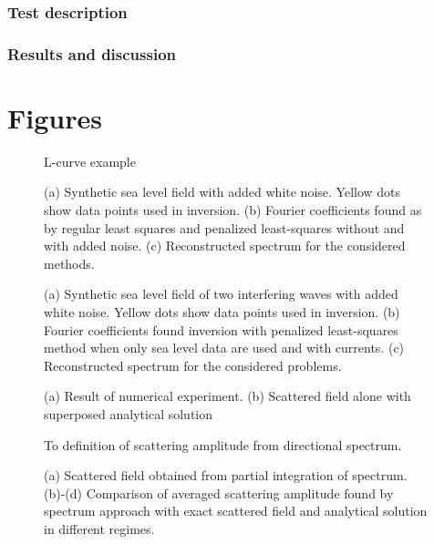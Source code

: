 \subsubsection{Test description}
\subsubsection{Results and discussion}

\newpage
\section{Figures}
\begin{figure}
	\centering
	\caption{L-curve example}
	\label{C1:F1.lcurve}
\end{figure}

\begin{figure}
	\caption{(a) Synthetic sea level field with added white noise. Yellow dots show data points 
	used in inversion. (b) Fourier coefficients found as by regular least squares and penalized 
	least-squares without and with added noise. (c) Reconstructed spectrum for the considered 
	methods.}
	\label{C1:F2.1w}
\end{figure}

\begin{figure}
	\label{C1:F2.2w}
	\centering
	\caption{(a) Synthetic sea level field of two interfering waves with added white noise. Yellow 
	dots show data points used in inversion. (b) Fourier coefficients found inversion with 
	penalized least-squares method when only sea level data are used and with currents. (c) 
	Reconstructed spectrum for the considered problems.}
\end{figure}

\begin{figure}
	\centering
	\caption{(a) Result of numerical experiment. (b) Scattered field alone with superposed 
		analytical solution}
\end{figure}

\begin{figure}
	\centering
	\caption{To definition of scattering amplitude from directional spectrum.}
\end{figure}

\begin{figure}
	\centering
	\caption{(a) Scattered field obtained from partial integration of spectrum. (b)-(d) Comparison 
		of averaged scattering amplitude found by spectrum approach with exact scattered field and 
		analytical solution in different regimes.}
\end{figure}


